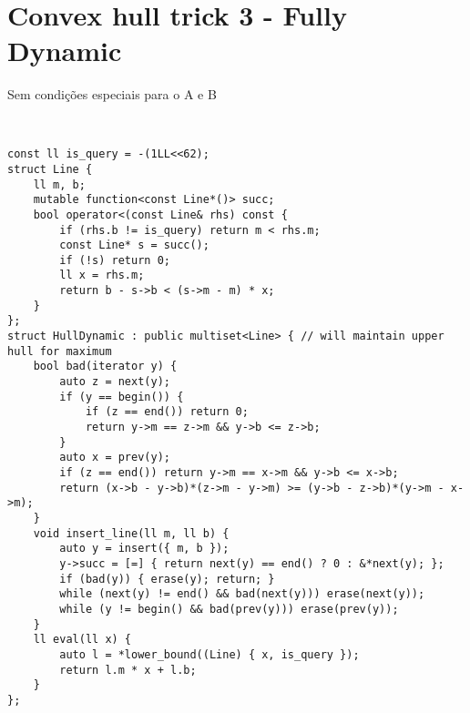 \section{Convex hull trick 3 - Fully Dynamic}

Sem condições especiais para o A e B

\begin{multicols}{2}
	\begin{lstlisting}


const ll is_query = -(1LL<<62);
struct Line {
	ll m, b;
	mutable function<const Line*()> succ;
	bool operator<(const Line& rhs) const {
		if (rhs.b != is_query) return m < rhs.m;
		const Line* s = succ();
		if (!s) return 0;
		ll x = rhs.m;
		return b - s->b < (s->m - m) * x;
	}
};
struct HullDynamic : public multiset<Line> { // will maintain upper hull for maximum
	bool bad(iterator y) {
		auto z = next(y);
		if (y == begin()) {
			if (z == end()) return 0;
			return y->m == z->m && y->b <= z->b;
		}
		auto x = prev(y);
		if (z == end()) return y->m == x->m && y->b <= x->b;
		return (x->b - y->b)*(z->m - y->m) >= (y->b - z->b)*(y->m - x->m);
	}
	void insert_line(ll m, ll b) {
		auto y = insert({ m, b });
		y->succ = [=] { return next(y) == end() ? 0 : &*next(y); };
		if (bad(y)) { erase(y); return; }
		while (next(y) != end() && bad(next(y))) erase(next(y));
		while (y != begin() && bad(prev(y))) erase(prev(y));
	}
	ll eval(ll x) {
		auto l = *lower_bound((Line) { x, is_query });
		return l.m * x + l.b;
	}
};

\end{lstlisting}
\end{multicols}


